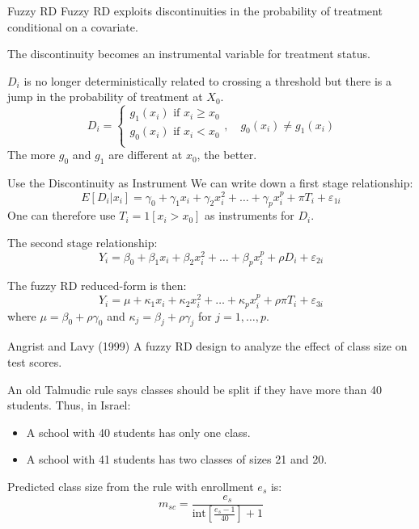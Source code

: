 \documentclass[handout]{beamer}
\begin{document}
\begin{frame}{Fuzzy RD}
	Fuzzy RD exploits discontinuities in the probability of treatment conditional on a covariate.\medskip
	
	The discontinuity becomes an instrumental variable for treatment status.\medskip
	
	$D_i$ is no longer deterministically related to crossing a threshold but there is a jump in the probability of treatment at $X_0$.
		\[D_i=\begin{cases*}
	g_1(x_i) \text{ if } x_i\ge x_0\\
	g_0(x_i) \text{ if } x_i< x_0\\
	\end{cases*}, \quad g_0(x_i)\ne g_1(x_i) \]
The more $g_0$ and $g_1$ are different at $x_0$, the better.\medskip
	
\end{frame}


\begin{frame}{Use the Discontinuity as Instrument}
	We can write down a first stage relationship:
	\[E[D_i|x_i ] = \gamma_{0}+\gamma_1 x_i+\gamma_2 x_i^2+\dots+\gamma_px_i^p+\pi T_i+\varepsilon_{1i} \] One can therefore use $T_i=1[x_i>x_0]$ as instruments for $D_i$.\medskip
	
	The second stage relationship:
	\[ Y_i=\beta_0+\beta_1 x_i+\beta_2 x_i^2+\dots+\beta_p x_i^p+\rho D_i+\varepsilon_{2i} \]
	
	The fuzzy RD reduced-form is then:
	\[Y_i = \mu + \kappa_1x_i + \kappa_2x_i^2+\dots+\kappa_p x_i^p+\rho\pi T_i+\varepsilon_{3i} \]
	where $\mu =\beta_0 + \rho \gamma_{0}$ and $\kappa_j =\beta_j + \rho \gamma_{j}$ for $j=1,\dots,p$.
	
\end{frame}

\begin{frame}{Angrist and Lavy (1999)}
A fuzzy RD design to analyze the effect of class size on test scores.\medskip

An old Talmudic rule says classes should be split if they have more than 40 students. Thus, in Israel:
\begin{itemize}
	\item A school with 40 students has only one class.
	\item A school with 41 students has two classes of sizes 21 and 20.
\end{itemize}\bigskip

Predicted class size from the rule with enrollment $e_s$ is:
\[m_{sc} = \frac{e_s}{\text{int}[\frac{e_s-1}{40}]+1}\]



\end{frame}
\end{document}
